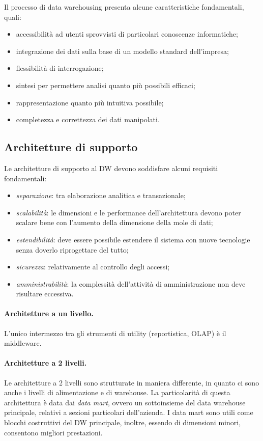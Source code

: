 \documentclass[a4paper, 10pt]{article}
\begin{document}
	Il processo di data warehousing presenta alcune caratteristiche fondamentali, quali: \begin{itemize}
		\item accessibilità ad utenti sprovvisti di particolari conoscenze informatiche;
		\item integrazione dei dati sulla base di un modello standard dell'impresa;
		\item flessibilità di interrogazione;
		\item sintesi per permettere analisi quanto più possibili efficaci;
		\item rappresentazione quanto più intuitiva possibile;
		\item completezza e correttezza dei dati manipolati.
	\end{itemize}

	\subsection{Architetture di supporto}
	Le architetture di supporto al DW devono soddisfare alcuni requisiti fondamentali: \begin{itemize}
		\item \textit{separazione}: tra elaborazione analitica e transazionale;
		\item \textit{scalabilità}: le dimensioni e le performance dell'architettura devono poter scalare bene con l'aumento della dimensione della mole di dati;
		\item \textit{estendibilità}: deve essere possibile estendere il sistema con nuove tecnologie senza doverlo riprogettare del tutto;
		\item \textit{sicurezza}: relativamente al controllo degli accessi;
		\item \textit{amministrabilità}: la complessità dell'attività di amministrazione non deve risultare eccessiva.
	\end{itemize}

	\paragraph{Architetture a un livello.} L'unico intermezzo tra gli strumenti di utility (reportistica, OLAP) è il middleware.

	\paragraph{Architetture a 2 livelli.} Le architetture a 2 livelli sono strutturate in maniera differente, in quanto ci sono anche i livelli di alimentazione e di warehouse. La particolarità di questa architettura è data dai \textit{data mart}, ovvero un sottoinsieme del data warehouse principale, relativi a sezioni particolari dell'azienda. I data mart sono utili come blocchi costruttivi del DW principale, inoltre, essendo di dimensioni minori, consentono migliori prestazioni.
	
\end{document}
